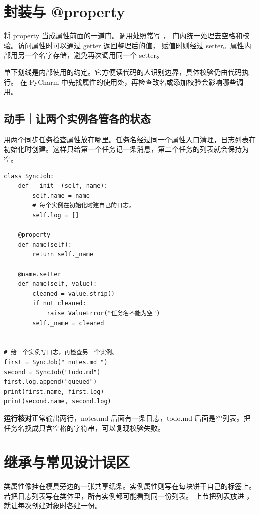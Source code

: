 \par


\section{封装与 @property}

将 property 当成属性前面的一道门。调用处照常写 ，
门内统一处理去空格和校验。访问属性时可以通过 getter 返回整理后的值，
赋值时则经过 setter。属性内部用另一个名字存储，避免再次调用同一个 setter。

单下划线是内部使用的约定。它方便读代码的人识别边界，具体校验仍由代码执行。
在 PyCharm 中先找属性的使用处，再检查改名或添加校验会影响哪些调用。

\subsection*{动手｜让两个实例各管各的状态}

用两个同步任务检查属性放在哪里。任务名经过同一个属性入口清理，日志列表在初始化时创建。这样只给第一个任务记一条消息，第二个任务的列表就会保持为空。

\begin{lstlisting}[title={\code{sync_jobs.py}}]
class SyncJob:
    def __init__(self, name):
        self.name = name
        # 每个实例在初始化时建自己的日志。
        self.log = []

    @property
    def name(self):
        return self._name

    @name.setter
    def name(self, value):
        cleaned = value.strip()
        if not cleaned:
            raise ValueError("任务名不能为空")
        self._name = cleaned


# 给一个实例写日志，再检查另一个实例。
first = SyncJob(" notes.md ")
second = SyncJob("todo.md")
first.log.append("queued")
print(first.name, first.log)
print(second.name, second.log)
\end{lstlisting}

\textbf{运行核对}\enspace 正常输出两行，notes.md 后面有一条日志，todo.md 后面是空列表。把任务名换成只含空格的字符串，可以复现校验失败。

\section{继承与常见设计误区}

类属性像挂在模具旁边的一张共享纸条。实例属性则写在每块饼干自己的标签上。
若把日志列表写在类体里，所有实例都可能看到同一份列表。
上节把列表放进 ，就让每次创建对象时各建一份。

